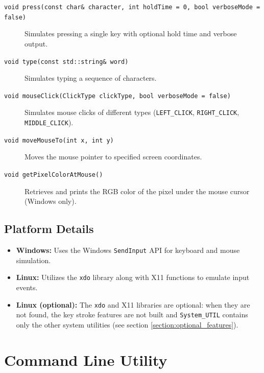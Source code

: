 \begin{description}
	\item[\texttt{void press(const char\& character, int holdTime = 0, bool verboseMode = false)}]  
	Simulates pressing a single key with optional hold time and verbose output.

	\item[\texttt{void type(const std::string\& word)}]  
	Simulates typing a sequence of characters.

	\item[\texttt{void mouseClick(ClickType clickType, bool verboseMode = false)}]  
	Simulates mouse clicks of different types (\texttt{LEFT\_CLICK}, \texttt{RIGHT\_CLICK}, \texttt{MIDDLE\_CLICK}).

	\item[\texttt{void moveMouseTo(int x, int y)}]  
	Moves the mouse pointer to specified screen coordinates.

	\item[\texttt{void getPixelColorAtMouse()}]  
	Retrieves and prints the RGB color of the pixel under the mouse cursor (Windows only).
\end{description}

\subsection{Platform Details}

\begin{itemize}\itemsep0em
	\item \textbf{Windows:} Uses the Windows \texttt{SendInput} API for keyboard and mouse simulation.

	\item \textbf{Linux:} Utilizes the \texttt{xdo} library along with X11 functions to emulate input events.

	\item \textbf{Linux (optional):} The \texttt{xdo} and X11 libraries are optional: when they are not found, the key stroke features are not built and \texttt{System\_UTIL} contains only the other system utilities (see section \ref{section:optional_features}).
\end{itemize}





\section{Command Line Utility}\label{section:command_line_utils}

